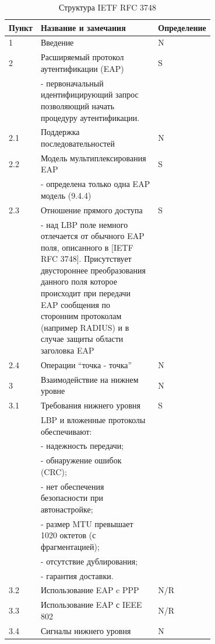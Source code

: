 \begin{longtable}{|l|p{0.7\linewidth}|l|}
  \caption{Структура IETF RFC 3748} \\ %
   \hline 
   Пункт & Название и замечания & Определение \\
   \hline
   1 & Введение  & N \\
   \hline
   2 & Расширяемый протокол аутентификации (EAP) & S \\ & - первоначальный идентифицирующий запрос позволяющий начать процедуру аутентификации.& \\
   \hline 
   2.1 & Поддержка последовательностей & N \\
   \hline
   2.2 & Модель мультиплексирования EAP & S \\ & - определена только одна EAP модель (9.4.4) &  \\
   \hline
   2.3 & Отношение прямого доступа & S \\ & - над LBP поле немного отлечается от обычного EAP поля, описанного в [IETF RFC 3748]. Присутствует двустороннее преобразования данного поля которое происходит при передачи EAP сообщения по сторонним протоколам (например RADIUS) и в случае защиты области заголовка EAP &  \\
   \hline
   2.4 & Операции ``точка - точка'' & N \\
   \hline
   3 & Взаимодействие на нижнем уровне & N \\
   \hline 
   3.1 & Требования нижнего уровня & S \\ & LBP и вложенные протоколы обеспечивают: & \\
    & - надежность передачи; & \\
    & - обнаружение ошибок (CRC); & \\
    & - нет обеспечения безопасности при автонастройке; & \\
    & - размер MTU превышает 1020 октетов (с фрагментацией); & \\
    & - отсутствие дублирования; & \\ 
    & - гарантия доставки. & \\
   \hline
   3.2 & Использование EAP c PPP & N/R \\
   \hline
   3.3 & Использование EAP с IEEE 802 & N/R \\
   \hline
   3.4 & Сигналы нижнего уровня & N \\

\end{longtable}
